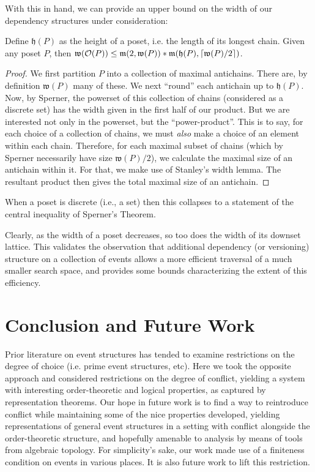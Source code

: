 \documentclass[a4paper,USenglish,cleveref, autoref, thm-restate,authorcolumns]{lipics-v2019}
\newcommand{\Oc}{\mathcal{O}}
\newcommand{\Mf}{\mathfrak{m}}
\newcommand{\Wf}{\mathfrak{w}}
\newcommand{\Hf}{\mathfrak{h}}
\DeclarePairedDelimiter\ceil{\lceil}{\rceil}
\begin{document}
With this in hand, we can provide an upper bound on the width of our dependency structures under consideration:

\begin{theorem}
Define \(\Hf(P)\) as the height of a poset, i.e. the length of its longest chain. Given any poset \(P\), then \(\Wf(\Oc(P)) \le \Mf(2,\Wf(P)) * \Mf(\Hf(P),\ceil{\Wf(P)/2})\).
\end{theorem}

\begin{proof} 
We first partition \(P\) into a collection of maximal antichains. There are, by definition \(\Wf(P)\) many of these. We next ``round'' each antichain up to \(\Hf(P)\). Now, by Sperner, the powerset of this collection of chains (considered as a discrete set) has the width given in the first half of our product. But we are interested not only in the powerset, but the ``power-product''. This is to say, for each choice of a collection of chains, we must \textit{also} make a choice of an element within each chain. Therefore, for each maximal subset of chains (which by Sperner necessarily have size \(\Wf(P)/2\)), we calculate the maximal size of an antichain within it. For that, we make use of Stanley's width lemma. The resultant product then gives the total maximal size of an antichain.
\end{proof}

When a poset is discrete (i.e., a set) then this collapses to a statement of the central inequality of Sperner's Theorem.

Clearly, as the width of a poset decreases, so too does the width of its downset lattice. This validates the observation that additional dependency (or versioning) structure on a collection of events allows a more efficient traversal of a much smaller search space, and provides some bounds characterizing the extent of this efficiency.

\section{Conclusion and Future  Work}
Prior literature on event structures has tended to examine restrictions on the degree of choice (i.e. prime event structures, etc). Here we took the opposite approach and considered restrictions on the degree of conflict, yielding a system with interesting order-theoretic and logical properties, as captured by representation theorems. Our hope in future work is to find a way to reintroduce conflict while maintaining some of the nice properties developed, yielding representations of general event structures in a setting with conflict alongside the order-theoretic structure, and hopefully amenable  to analysis by means of tools from algebraic topology. For simplicity's sake, our work made use of a finiteness condition on events in various places. It is also future work to lift this restriction.




\end{document}
